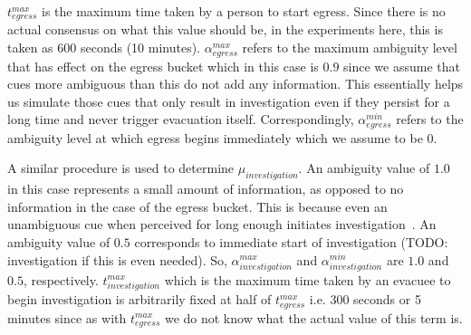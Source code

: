 $t^{max}_{egress}$ is the maximum time taken by a person to start egress. Since there is no actual consensus on what this value should be, in the experiments here, this is taken as 600 seconds (10 minutes). $\alpha^{max}_{egress}$ refers to the maximum ambiguity level that has effect on the egress bucket which in this case is $0.9$ since we assume that cues more ambiguous than this do not add any information. This essentially helps us simulate those cues that only result in investigation even if they persist for a long time and never trigger evacuation itself. Correspondingly, $\alpha^{min}_{egress}$ refers to the ambiguity level at which egress begins immediately which we assume to be $0$.


A similar procedure is used to determine $\mu_{investigation}$. An ambiguity value of $1.0$ in this case represents a small amount of information, as opposed to no information in the case of the egress bucket. This is because even an unambiguous cue when perceived for long enough initiates investigation~\cite{Tong:1985wn}. An ambiguity value of $0.5$ corresponds to immediate start of investigation (TODO: investigation if this is even needed).
So, $\alpha^{max}_{investigation}$ and $\alpha^{min}_{investigation}$ are $1.0$ and $0.5$, respectively. $t^{max}_{investigation}$ which is the maximum time taken by an evacuee to begin investigation is arbitrarily fixed at half of $t^{max}_{egress}$ i.e. 300 seconds or 5 minutes since as with $t^{max}_{egress}$ we do not know what the actual value of this term is.

